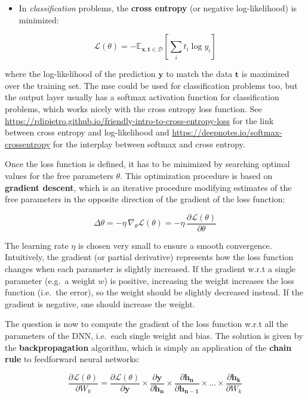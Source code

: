 \documentclass[
  letterpaper,
  DIV=11,
  numbers=noendperiod]{scrreprt}
\providecommand{\tightlist}{%
  \setlength{\itemsep}{0pt}\setlength{\parskip}{0pt}}\usepackage{longtable,booktabs,array}
\begin{document}
\begin{itemize}
\tightlist
\item
  In \emph{classification} problems, the \textbf{cross entropy} (or
  negative log-likelihood) is minimized:
\end{itemize}

\[
    \mathcal{L}(\theta) = - \mathbb{E}_{\mathbf{x}, \mathbf{t} \in \mathcal{D}} [\sum_i t_i \log y_i]
\]

where the log-likelihood of the prediction \(\mathbf{y}\) to match the
data \(\mathbf{t}\) is maximized over the training set. The mse could be
used for classification problems too, but the output layer usually has a
softmax activation function for classification problems, which works
nicely with the cross entropy loss function. See
\url{https://rdipietro.github.io/friendly-intro-to-cross-entropy-loss}
for the link between cross entropy and log-likelihood and
\url{https://deepnotes.io/softmax-crossentropy} for the interplay
between softmax and cross entropy.

Once the loss function is defined, it has to be minimized by searching
optimal values for the free parameters \(\theta\). This optimization
procedure is based on \textbf{gradient descent}, which is an iterative
procedure modifying estimates of the free parameters in the opposite
direction of the gradient of the loss function:

\[
\Delta \theta = -\eta \, \nabla_\theta \mathcal{L}(\theta) = -\eta \, \frac{\partial \mathcal{L}(\theta)}{\partial \theta}
\]

The learning rate \(\eta\) is chosen very small to ensure a smooth
convergence. Intuitively, the gradient (or partial derivative)
represents how the loss function changes when each parameter is slightly
increased. If the gradient w.r.t a single parameter (e.g.~a weight
\(w\)) is positive, increasing the weight increases the loss function
(i.e.~the error), so the weight should be slightly decreased instead. If
the gradient is negative, one should increase the weight.

The question is now to compute the gradient of the loss function w.r.t
all the parameters of the DNN, i.e.~each single weight and bias. The
solution is given by the \textbf{backpropagation} algorithm, which is
simply an application of the \textbf{chain rule} to feedforward neural
networks:

\[
    \frac{\partial \mathcal{L}(\theta)}{\partial W_k} = \frac{\partial \mathcal{L}(\theta)}{\partial \mathbf{y}} \times \frac{\partial \mathbf{y}}{\partial \mathbf{h_n}} \times \frac{\partial \mathbf{h_n}}{\partial \mathbf{h_{n-1}}} \times \ldots \times \frac{\partial \mathbf{h_k}}{\partial W_k}
\]
\end{document}
